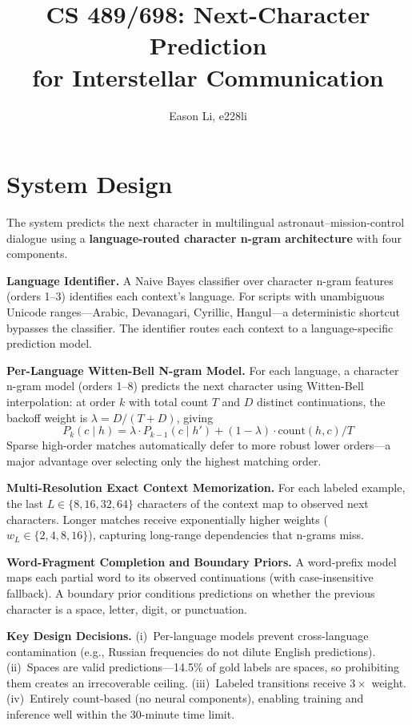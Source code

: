 \documentclass[11pt]{article}
\title{\vspace{-1.5em}CS 489/698: Next-Character Prediction \\ for Interstellar Communication\vspace{-0.5em}}
\author{Eason Li, e228li}
\date{}
\begin{document}
\maketitle
\vspace{-2em}

\section{System Design}

The system predicts the next character in multilingual astronaut--mission-control dialogue using a \textbf{language-routed character n-gram architecture} with four components.

\textbf{Language Identifier.}
A Naive Bayes classifier over character n-gram features (orders 1--3) identifies each context's language. For scripts with unambiguous Unicode ranges---Arabic, Devanagari, Cyrillic, Hangul---a deterministic shortcut bypasses the classifier. The identifier routes each context to a language-specific prediction model.

\textbf{Per-Language Witten-Bell N-gram Model.}
For each language, a character n-gram model (orders 1--8) predicts the next character using Witten-Bell interpolation: at order $k$ with total count $T$ and $D$ distinct continuations, the backoff weight is $\lambda = D/(T+D)$, giving 
\[ P_k(c \mid h) = \lambda \cdot P_{k-1}(c \mid h') + (1-\lambda) \cdot \text{count}(h,c)/T\] 
Sparse high-order matches automatically defer to more robust lower orders---a major advantage over selecting only the highest matching order.

\textbf{Multi-Resolution Exact Context Memorization.}
For each labeled example, the last $L \in \{8, 16, 32, 64\}$ characters of the context map to observed next characters. Longer matches receive exponentially higher weights ($w_L \in \{2, 4, 8, 16\}$), capturing long-range dependencies that n-grams miss.

\textbf{Word-Fragment Completion and Boundary Priors.}
A word-prefix model maps each partial word to its observed continuations (with case-insensitive fallback). A boundary prior conditions predictions on whether the previous character is a space, letter, digit, or punctuation.

\textbf{Key Design Decisions.}
(i)~Per-language models prevent cross-language contamination (e.g., Russian frequencies do not dilute English predictions).
(ii)~Spaces are valid predictions---14.5\% of gold labels are spaces, so prohibiting them creates an irrecoverable ceiling.
(iii)~Labeled transitions receive $3\times$ weight.
(iv)~Entirely count-based (no neural components), enabling training and inference well within the 30-minute time limit.
\end{document}
